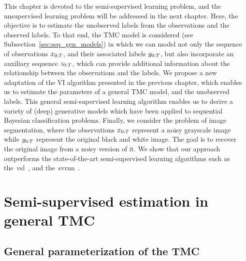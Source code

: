 This chapter is devoted to the semi-supervised learning problem, 
and the unsupervised learning problem  will be addressed in the next chapter.
Here, the objective is to estimate the unobserved labels from the observations
and the observed labels. To that end, the TMC model is  considered (see Subsection~\ref{sec:seq_gen_models})
 in which we can model not only the
sequence of observations $x_{0:T}$, 
and their associated labels $y_{0:T}$, but also incorporate an 
auxiliary sequence $z_{0:T}$,  which can provide additional information
about the relationship between the observations and the labels.
We  propose a new adaptation of the VI algorithm
presented in the previous chapter, which enables us to estimate the parameters
of a general TMC model, and the unobserved labels. 
This general semi-supervised learning algorithm enables us to derive a variety
of (deep) generative models which have been applied to sequential Bayesian
classification problems. Finally, we consider the problem of image segmentation, where
the observations $x_{0:T}$ represent a 
noisy grayscale image while $y_{0:T}$ represent
the original black and white image.
The goal is to recover the original image from a noisy version of it.
We show that our approach outperforms the
state-of-the-art semi-supervised learning algorithms 
such as the~\gls*{vsl}~\citep{chen2019variational},
and the~\gls*{svrnn}~\citep{butepage2019predicting}.


\section{Semi-supervised estimation in general TMC}
\label{chp:gen_tmc}
\subsection{General parameterization of the TMC}
\label{sec:general_param_tmc}

